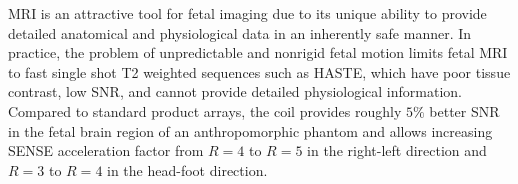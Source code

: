 MRI is an attractive tool for fetal imaging due to its unique ability to provide detailed anatomical and physiological
data in an inherently safe manner. In practice, the problem of unpredictable and nonrigid fetal motion limits fetal MRI
to fast single shot T2 weighted sequences such as HASTE, which have poor tissue contrast, low SNR, and cannot provide
detailed physiological information. Compared to standard product arrays, the coil provides roughly $5\%$ better SNR in
the fetal brain region of an anthropomorphic phantom and allows increasing SENSE acceleration factor from $R=4$ to $R=5$
in the right-left direction and $R=3$ to $R=4$ in the head-foot direction.

